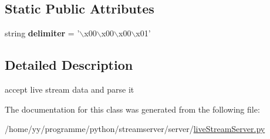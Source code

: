 \subsection*{Static Public Attributes}
\begin{DoxyCompactItemize}
\item 
\hypertarget{classpython_1_1streamserver_1_1server_1_1liveStreamServer_1_1LiveProtocol_a8f1edd568d95101888a5dc692ca83503}{
string {\bfseries delimiter} = '$\backslash$x00$\backslash$x00$\backslash$x00$\backslash$x01'}
\label{classpython_1_1streamserver_1_1server_1_1liveStreamServer_1_1LiveProtocol_a8f1edd568d95101888a5dc692ca83503}

\end{DoxyCompactItemize}


\subsection{Detailed Description}
\begin{DoxyVerb}accept live stream data and parse it\end{DoxyVerb}
 

The documentation for this class was generated from the following file:\begin{DoxyCompactItemize}
\item 
/home/yy/programme/python/streamserver/server/\hyperlink{liveStreamServer_8py}{liveStreamServer.py}\end{DoxyCompactItemize}
